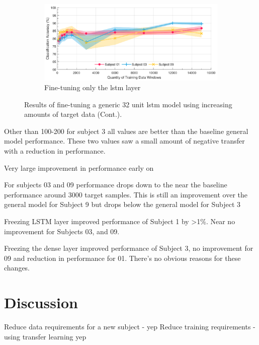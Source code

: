 \begin{figure}[t]\ContinuedFloat
    \begin{subfigure}{\textwidth}
        \centering
        \includegraphics[width=\textwidth]{content/5-Personalisation/ch5_frozen_dense_layer_accuracy.pdf}
        \caption{Fine-tuning only the \acrshort{lstm} layer}
    \end{subfigure}
    \caption[]{Results of fine-tuning a generic 32 unit \acrshort{lstm} model using increasing amounts of target data (Cont.).}
\end{figure}

Other than 100-200 for subject 3 all values are better than the baseline general model performance. These two values saw a small amount of negative transfer with a reduction in performance.

Very large improvement in performance early on

For subjects 03 and 09 performance drops down to the near the baseline performance around 3000 target samples. This is still an improvement over the general model for Subject 9 but drops below the general model for Subject 3

Freezing LSTM layer improved performance of Subject 1 by >1\%. Near no improvement for Subjects 03, and 09.

Freezing the dense layer improved performance of Subject 3, no improvement for 09 and reduction in performance for 01. There's no obvious reasons for these changes.


\section{Discussion}
\label{sec:personalisation-discussion}
Reduce data requirements for a new subject - yep
Reduce training requirements - using transfer learning yep

